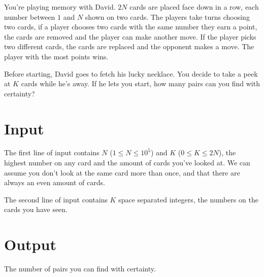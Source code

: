 You're playing memory with David. $2N$ cards are placed face down in a row, each number between $1$ and $N$ shown on two cards. The players take turns choosing two cards, if a player chooses two cards with the same number they earn a point, the cards are removed and the player can make another move. If the player picks two different cards, the cards are replaced and the opponent makes a move. The player with the most points wins. 

Before starting, David goes to fetch his lucky necklace. You decide to take a peek at $K$ cards while he's away. If he lets you start, how many pairs can you find with certainty?

\section*{Input}

The first line of input contains $N$ ($1 \leq N \leq 10^5$) and $K$ ($0 \leq K \leq 2N$), the highest number on any card and the amount of cards you've looked at. We can assume you don't look at the same card more than once, and that there are always an even amount of cards.

The second line of input contains $K$ space separated integers, the numbers on the cards you have seen. 

\section*{Output}

The number of pairs you can find with certainty.
